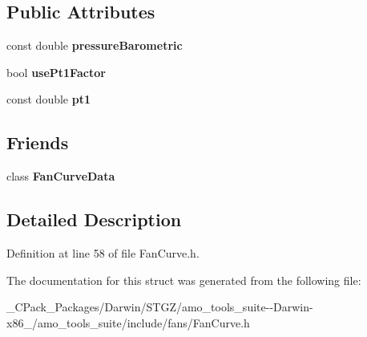 \subsection*{Public Attributes}
\begin{DoxyCompactItemize}
\item 
\mbox{\label{struct_fan_curve_data_1_1_base_operating_point_ab66cd337152255bf82b7ef98f828144b}} 
const double {\bfseries pressure\+Barometric}
\item 
\mbox{\label{struct_fan_curve_data_1_1_base_operating_point_a4d09155765f22458b9feb10d77a188de}} 
bool {\bfseries use\+Pt1\+Factor}
\item 
\mbox{\label{struct_fan_curve_data_1_1_base_operating_point_ab349de155902de5f1a2c6dc6f48191b3}} 
const double {\bfseries pt1}
\end{DoxyCompactItemize}
\subsection*{Friends}
\begin{DoxyCompactItemize}
\item 
\mbox{\label{struct_fan_curve_data_1_1_base_operating_point_a6c0df668730aa3a6673d279f2bbe7799}} 
class {\bfseries Fan\+Curve\+Data}
\end{DoxyCompactItemize}


\subsection{Detailed Description}


Definition at line 58 of file Fan\+Curve.\+h.



The documentation for this struct was generated from the following file\+:\begin{DoxyCompactItemize}
\item 
\+\_\+\+C\+Pack\+\_\+\+Packages/\+Darwin/\+S\+T\+G\+Z/amo\+\_\+tools\+\_\+suite-\/-\/\+Darwin-\/x86\+\_/amo\+\_\+tools\+\_\+suite/include/fans/Fan\+Curve.\+h\end{DoxyCompactItemize}
